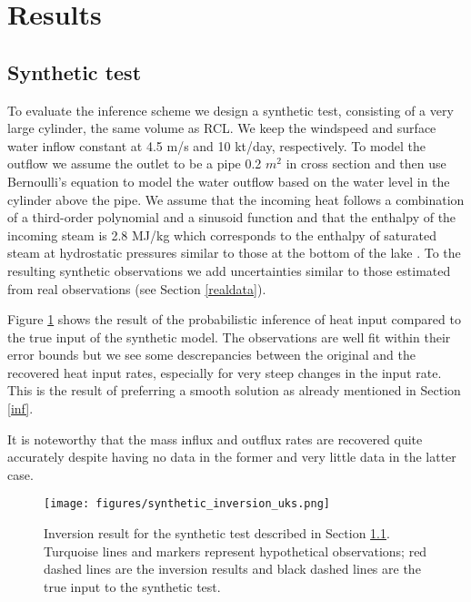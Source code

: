 \documentclass{bmc_template/bmcart}
\begin{document}
\section{Results}
\subsection{Synthetic test}\label{syn_test} 

To evaluate the inference scheme we design a synthetic test, consisting of a
very large cylinder, the same volume as RCL. We keep the windspeed and surface
water inflow constant at 4.5 m/s and 10 kt/day, respectively. To model the
outflow we assume the outlet to be a pipe 0.2 $m^2$ in cross section and then
use Bernoulli's equation to model the water outflow based on the water level in
the cylinder above the pipe. We assume that the incoming heat follows a
combination of a third-order polynomial and a sinusoid function and that the
enthalpy of the incoming steam is 2.8 MJ/kg which corresponds to the enthalpy of
saturated steam at hydrostatic pressures similar to those at the bottom of the
lake \cite{Mayhew1978}. To the resulting synthetic observations we add
uncertainties similar to those estimated from real observations (see Section
\ref{realdata}).

Figure \ref{syn_example} shows the result of the probabilistic inference of
heat input compared to the true input of the synthetic model. The observations
are well fit within their error bounds but we see some descrepancies between
the original and the recovered heat input rates, especially for very steep
changes in the input rate. This is the result of preferring a smooth solution
as already mentioned in Section \ref{inf}.

It is noteworthy that the mass influx and outflux rates are recovered
quite accurately despite having no data in the former and very little data
in the latter case.

\begin{figure}
	\texttt{[image: figures/synthetic\_inversion\_uks.png]}  
    \caption{Inversion result for the synthetic test described in Section 
        \ref{syn_test}. Turquoise lines and markers represent hypothetical
        observations; red dashed lines are the inversion results and black
        dashed lines are the true input to the synthetic test.}
  \label{syn_example}
\end{figure}
\end{document}
